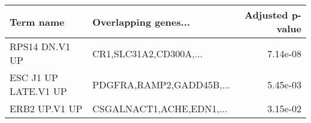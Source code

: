 \begin{tabular}{llr}
\toprule
           Term name &     Overlapping genes... &  Adjusted p-value \\
\midrule
      RPS14 DN.V1 UP &   CR1,SLC31A2,CD300A,... &          7.14e-08 \\
ESC J1 UP LATE.V1 UP & PDGFRA,RAMP2,GADD45B,... &          5.45e-03 \\
       ERB2 UP.V1 UP & CSGALNACT1,ACHE,EDN1,... &          3.15e-02 \\
\bottomrule
\end{tabular}
